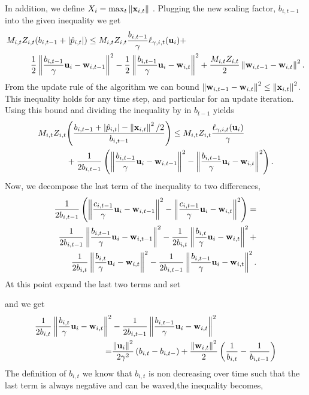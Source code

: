 {In addition, we define $X_i=\max_t{\Vert\mathbf{x}_{i,t}\Vert}$ . Plugging the new scaling factor, $b_{i,t-1}$ into the given inequality we get 
\begin{equation*}
\begin{split}
M_{i,t}Z_{i,t}{\left({b_{i,t-1} +\left\vert{\hat{p}_{i,t}}\right\vert}\right)} \le M_{i,t}&Z_{i,t}\frac{b_{i,t-1}}{\gamma} \ell_{\gamma,i,t}(\mathbf{u}_i)+\\ 
\frac{1}{2}\left\Vert {\frac{b_{i,t-1}}{\gamma} \mathbf{u}_i-\mathbf{w}_{i,t-1}} \right\Vert^2&-\frac{1}{2}\left\Vert {\frac{b_{i,t-1}}{\gamma} \mathbf{u}_i-\mathbf{w}_{i,t}} \right\Vert^2+
\frac{M_{i,t}Z_{i,t}}{2}\left\Vert {\mathbf{w}_{i,t-1}-\mathbf{w}_{i,t}} \right\Vert^2.
\end{split}
\end{equation*}
 From the update rule of the  algorithm we can bound $\left\Vert {\mathbf{w}_{i,t-1}-\mathbf{w}_{i,t}} \right\Vert^2\le \left\Vert {\mathbf{x}_{i,t}} \right\Vert^2$. This inequality holds for any time step, and particular for an update iteration. Using this bound and dividing the inequality by in  $b_{t-1}$ yields
\begin{equation}
\begin{split}
M_{i,t}Z_{i,t}&{\left({\frac{b_{i,t-1} +\left\vert{\hat{p}_{i,t}}\right\vert-\left\Vert {\mathbf{x}_{i,t}} \right\Vert^2/2}{b_{i,t-1}}}\right)} \le M_{i,t}Z_{i,t}\frac{\ell_{\gamma,i,t}(\mathbf{u}_i)}{\gamma} \\ 
&+\frac{1}{2b_{i,t-1
}}\left({\left\Vert {\frac{b_{i,t-1}}{\gamma} \mathbf{u}_i-\mathbf{w}_{i,t-1}} \right\Vert^2-\left\Vert {\frac{b_{i,t-1}}{\gamma} \mathbf{u}_i-\mathbf{w}_{i,t}} \right\Vert^2}\right).
\label{eq:adaptive_b_first_step}
\end{split}
\end{equation}
Now, we decompose the last term of the inequality to two  differences,
\begin{equation*}
\begin{split}
\frac{1}{2b_{i,t-1}}
\left({\left\Vert {\frac{c_{i,t-1}}{\gamma} \mathbf{u}_i-\mathbf{w}_{i,t-1}} \right\Vert^2-\left\Vert {\frac{c_{i,t-1}}{\gamma} \mathbf{u}_i-\mathbf{w}_{i,t}} \right\Vert^2}\right)= \\
\frac{1}{2b_{i,t-1}}\left\Vert {\frac{b_{i,t-1}}{\gamma} \mathbf{u}_i-\mathbf{w}_{i,t-1}} \right\Vert^2-\frac{1}{2b_{i,t}}\left\Vert {\frac{b_{i,t}}{\gamma} \mathbf{u}_i-\mathbf{w}_{i,t}} \right\Vert^2+\\
\frac{1}{2b_{i,t}}\left\Vert {\frac{b_{i,t}}{\gamma} \mathbf{u}_i-\mathbf{w}_{i,t}} \right\Vert^2-\frac{1}{2b_{i,t-1}}\left\Vert {\frac{b_{i,t-1}}{\gamma} \mathbf{u}_i-\mathbf{w}_{i,t}} \right\Vert^2.
\end{split}
\end{equation*}
At this point  expand the last two terms and  set   

and we get
\begin{equation*}
\begin{split}
\frac{1}{2b_{i,t}}\left\Vert {\frac{b_{i,t}}{\gamma} \mathbf{u}_i-\mathbf{w}_{i,t}} \right\Vert^2&-\frac{1}{2b_{i,t-1}}\left\Vert {\frac{b_{i,t-1}}{\gamma} \mathbf{u}_i-\mathbf{w}_{i,t}} \right\Vert^2\\
=&\frac{\left\Vert {\mathbf{u}_i} \right\Vert^2}{2\gamma^2}\left({b_{{i,t}}-b_{{i,t-}}}\right)
+\frac{\left\Vert {\mathbf{w}_{i,t}} \right\Vert^2}{2}\left({\frac{1}{b_{i,t}}-\frac{1}{b_{i,t-1}}}\right)
\end{split}
\end{equation*}
The definition of $b_{i,t}$ we know that $b_{i,t}$ is non decreasing over time such that the last term is always negative and can be waved,the inequality becomes,

}
